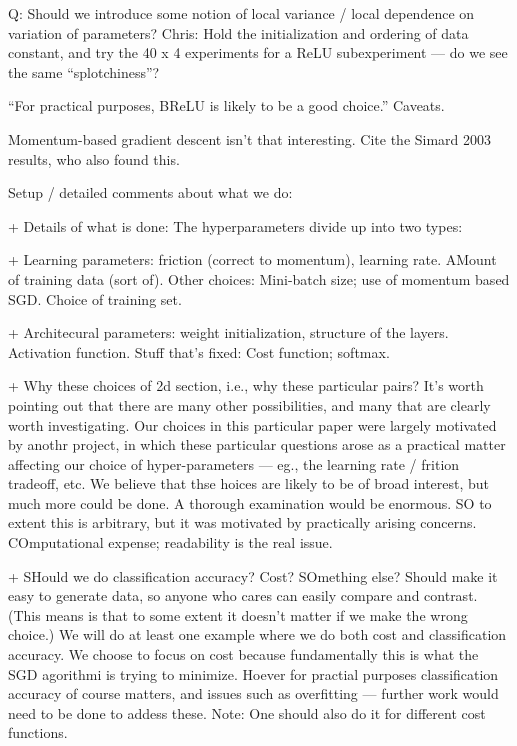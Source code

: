 \documentclass[10pt]{article}
\begin{document}
Q: Should we introduce some notion of local variance / local
dependence on variation of parameters?  Chris: Hold the initialization
and ordering of data constant, and try the 40 x 4 experiments for a
ReLU subexperiment --- do we see the same ``splotchiness''?

``For practical purposes, BReLU is likely to be a good choice.''
Caveats.

Momentum-based gradient descent isn't that interesting.  Cite the
Simard 2003 results, who also found this.








Setup / detailed comments about what we do: 

+ Details of what is done: The hyperparameters divide up into two types:

+ Learning parameters: friction (correct to momentum), learning rate.
AMount of training data (sort of).  Other choices: Mini-batch size;
use of momentum based SGD.  Choice of training set.

+ Architecural parameters: weight initialization, structure of the
layers.  Activation function.  Stuff that's fixed: Cost function;
softmax.

+ Why these choices of 2d section, i.e., why these particular pairs?
It's worth pointing out that there are many other possibilities, and
many that are clearly worth investigating.  Our choices in this
particular paper were largely motivated by anothr project, in which
these particular questions arose as a practical matter affecting our
choice of hyper-parameters --- eg., the learning rate / frition
tradeoff, etc.  We believe that thse hoices are likely to be of broad
interest, but much more could be done.  A thorough examination would
be enormous.  SO to extent this is arbitrary, but it was motivated by
practically arising concerns.  COmputational expense; readability is
the real issue.


+ SHould we do classification accuracy?  Cost?  SOmething else?
Should make it easy to generate data, so anyone who cares can easily
compare and contrast.  (This means is that to some extent it doesn't
matter if we make the wrong choice.)  We will do at least one example
where we do both cost and classification accuracy.  We choose to focus
on cost because fundamentally this is what the SGD agorithmi is trying
to minimize.  Hoever for practial purposes classification accuracy of
course matters, and issues such as overfitting --- further work would
need to be done to addess these.  Note: One should also do it for
different cost functions.
\end{document}
